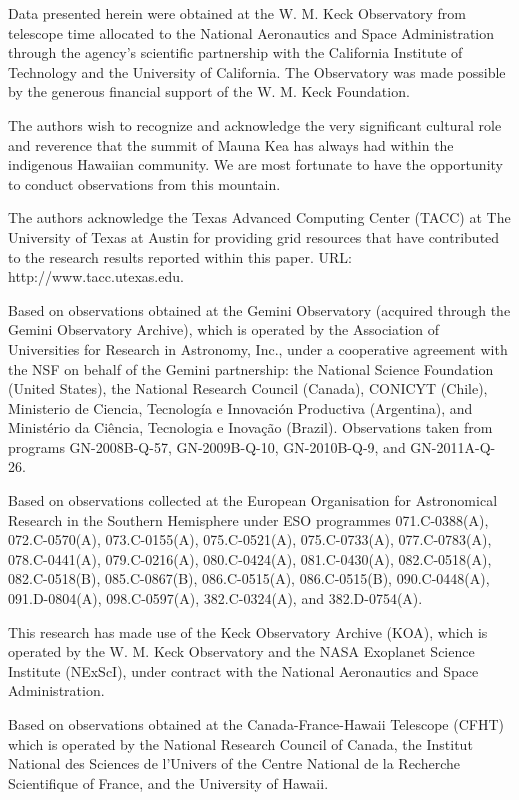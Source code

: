\documentclass[twocolumn]{aastex62}
\begin{document}
Data presented herein were obtained at the W. M. Keck Observatory from telescope time allocated to the National Aeronautics and Space Administration through the agency's scientific partnership with the California Institute of Technology and the University of California. The Observatory was made possible by the generous financial support of the W. M. Keck Foundation.

The authors wish to recognize and acknowledge the very significant cultural role and reverence that the summit of Mauna Kea has always had within the indigenous Hawaiian community. We are most fortunate to have the opportunity to conduct observations from this mountain.

The authors acknowledge the Texas Advanced Computing Center (TACC) at The University of Texas at Austin for providing grid resources that have contributed to the research results reported within this paper. URL: http://www.tacc.utexas.edu.

Based on observations obtained at the Gemini Observatory (acquired through the Gemini Observatory Archive), which is operated by the Association of Universities for Research in Astronomy, Inc., under a cooperative agreement with the NSF on behalf of the Gemini partnership: the National Science Foundation (United States), the National Research Council (Canada), CONICYT (Chile), Ministerio de Ciencia, Tecnolog\'{i}a e Innovaci\'{o}n Productiva (Argentina), and Minist\'{e}rio da Ci\^{e}ncia, Tecnologia e Inova\c{c}\~{a}o (Brazil). Observations taken from programs GN-2008B-Q-57, GN-2009B-Q-10, GN-2010B-Q-9, and GN-2011A-Q-26.

Based on observations collected at the European Organisation for Astronomical Research in the Southern Hemisphere under ESO programmes 071.C-0388(A), 072.C-0570(A), 073.C-0155(A), 075.C-0521(A), 075.C-0733(A), 077.C-0783(A), 078.C-0441(A), 079.C-0216(A), 080.C-0424(A), 081.C-0430(A), 082.C-0518(A), 082.C-0518(B), 085.C-0867(B), 086.C-0515(A), 086.C-0515(B), 090.C-0448(A), 091.D-0804(A), 098.C-0597(A), 382.C-0324(A), and 382.D-0754(A).

 This research has made use of the Keck Observatory Archive (KOA), which is operated by the W. M. Keck Observatory and the NASA Exoplanet Science Institute (NExScI), under contract with the National Aeronautics and Space Administration. 

Based on observations obtained at the Canada-France-Hawaii Telescope (CFHT) which is operated by the National Research Council of Canada, the Institut National des Sciences de l'Univers of the Centre National de la Recherche Scientifique of France, and the University of Hawaii. 
\end{document}
